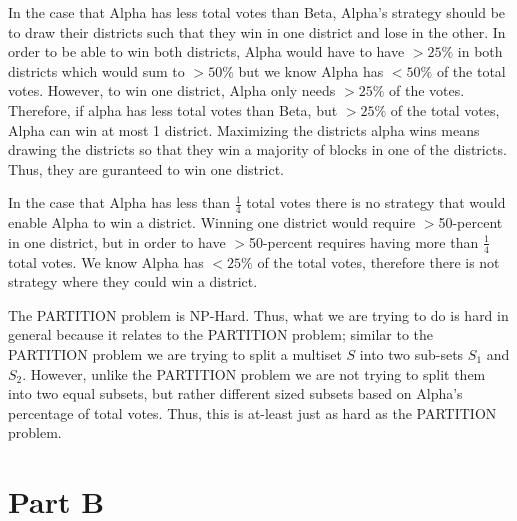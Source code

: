 \documentclass[12pt]{article}%
\begin{document}
In the case that Alpha has less total votes than Beta, Alpha's strategy should be to draw their districts such that they win in one district and lose in the other. In order to be able to win both districts, Alpha would have to have $> 25 \%$ in both districts which would sum to $> 50\%$ but we know Alpha has $ < 50\%$ of the total votes. However, to win one district, Alpha only needs $> 25\%$ of the votes. Therefore, if alpha has less total votes than Beta, but $> 25\%$ of the total votes, Alpha can win at most 1 district. Maximizing the districts alpha wins means drawing the districts so that they win a majority of blocks in one of the districts. Thus, they are guranteed to win one district.
\newline

In the case that Alpha has less than $\frac{1}{4}$ total votes there is no strategy that would enable Alpha to win a district. Winning one district would require $>$50-percent in one district, but in order to have $>$50-percent requires having more than $\frac{1}{4}$ total votes. We know Alpha has $< 25\%$ of the total votes, therefore there is not strategy where they could win a district.
\newline

The PARTITION problem is NP-Hard.  Thus, what we are trying to do is hard in general because it relates to the PARTITION problem; similar to the PARTITION problem we are trying to split a multiset $S$ into two sub-sets $S_1$ and $S_2$.  However, unlike the PARTITION problem we are not trying to split them into two equal subsets, but rather different sized subsets based on Alpha's percentage of total votes.  Thus, this is at-least just as hard as the PARTITION problem.
\newline

\section*{Part B}
\end{document}
